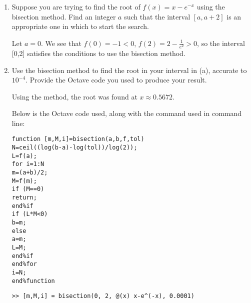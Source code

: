 \documentclass{article}
\theoremstyle{plain} %
\numberwithin{thm}{section} %
\theoremstyle{definition}
\begin{document}
    \begin{question}{6}
        \begin{enumerate}[label=(\alph*)]
            \item Suppose you are trying to find the root of \(f(x) = x - e^{-x}\) using the bisection method. Find an integer \(a\) such that the interval \([a, a+2]\) is an appropriate one in which to start the search.
            
            Let \(a = 0\). We see that \(f(0) = -1 < 0\), \(f(2) = 2 - \frac{1}{e^2} > 0\), so the interval [0,2] satisfies the conditions to use the bisection method.

            \item Use the bisection method to find the root in your interval in (a), accurate to \(10^{-4}\). Provide the Octave code you used to produce your result.
            
            Using the method, the root was found at \(x \approx 0.5672\).

            Below is the Octave code used, along with the command used in command line:
            \begin{lstlisting}
function [m,M,i]=bisection(a,b,f,tol)
N=ceil((log(b-a)-log(tol))/log(2));
L=f(a);
for i=1:N
m=(a+b)/2;
M=f(m);
if (M==0)
return;
end%if
if (L*M<0)
b=m;
else
a=m;
L=M;
end%if
end%for
i=N;
end%function
            \end{lstlisting}
            \begin{lstlisting}[numbers=none]
>> [m,M,i] = bisection(0, 2, @(x) x-e^(-x), 0.0001)
            \end{lstlisting}
        \end{enumerate}
    \end{question}
\end{document}
